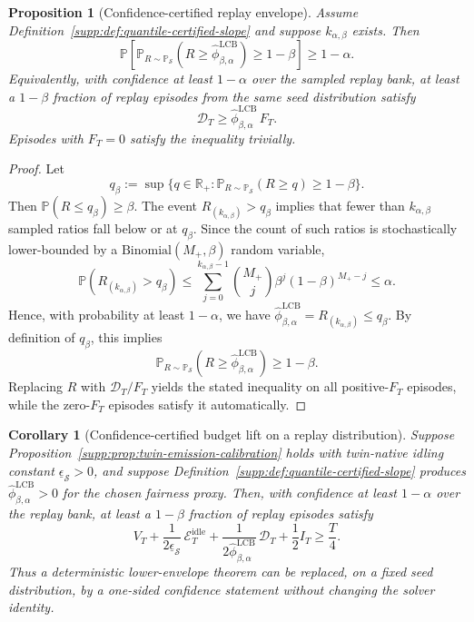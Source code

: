 \documentclass[11pt]{article}
\newcommand{\Prob}{\mathbb{P}}
\newcommand{\1}{\mathbf{1}}
\theoremstyle{definition}
\theoremstyle{plain}
\newtheorem{proposition}[definition]{Proposition}
\newtheorem{corollary}[definition]{Corollary}
\theoremstyle{remark}
\begin{document}
\begin{proposition}[Confidence-certified replay envelope]
\label{supp:prop:confidence-envelope}
Assume Definition~\ref{supp:def:quantile-certified-slope} and suppose $k_{\alpha,\beta}$ exists. Then
\[
\Prob\!\left[
\Prob_{R\sim \Prob_{\mathcal S}}\!\left(R \ge \widehat\phi^{\mathrm{LCB}}_{\beta,\alpha}\right) \ge 1-\beta
\right]
\ge 1-\alpha.
\]
Equivalently, with confidence at least $1-\alpha$ over the sampled replay bank, at least a $1-\beta$ fraction of replay episodes from the same seed distribution satisfy
\[
\mathcal D_T \ge \widehat\phi^{\mathrm{LCB}}_{\beta,\alpha}\,F_T.
\]
Episodes with $F_T=0$ satisfy the inequality trivially.
\end{proposition}

\begin{proof}
Let
\[
q_\beta := \sup\{q\in\mathbb R_+ : \Prob_{R\sim \Prob_{\mathcal S}}(R\ge q)\ge 1-\beta\}.
\]
Then $\Prob(R\le q_\beta)\ge \beta$. The event $R_{(k_{\alpha,\beta})}>q_\beta$ implies that fewer than $k_{\alpha,\beta}$ sampled ratios fall below or at $q_\beta$. Since the count of such ratios is stochastically lower-bounded by a $\mathrm{Binomial}(M_+,\beta)$ random variable,
\[
\Prob\!\left(R_{(k_{\alpha,\beta})}>q_\beta\right)
\le
\sum_{j=0}^{k_{\alpha,\beta}-1}\binom{M_+}{j}\beta^j(1-\beta)^{M_+-j}
\le \alpha.
\]
Hence, with probability at least $1-\alpha$, we have $\widehat\phi^{\mathrm{LCB}}_{\beta,\alpha}=R_{(k_{\alpha,\beta})}\le q_\beta$. By definition of $q_\beta$, this implies
\[
\Prob_{R\sim \Prob_{\mathcal S}}\!\left(R\ge \widehat\phi^{\mathrm{LCB}}_{\beta,\alpha}\right) \ge 1-\beta.
\]
Replacing $R$ with $\mathcal D_T/F_T$ yields the stated inequality on all positive-$F_T$ episodes, while the zero-$F_T$ episodes satisfy it automatically.
\end{proof}

\begin{corollary}[Confidence-certified budget lift on a replay distribution]
\label{supp:cor:confidence-budget-lift}
Suppose Proposition~\ref{supp:prop:twin-emission-calibration} holds with twin-native idling constant $\underline\epsilon_{\mathcal S}>0$, and suppose Definition~\ref{supp:def:quantile-certified-slope} produces $\widehat\phi^{\mathrm{LCB}}_{\beta,\alpha}>0$ for the chosen fairness proxy. Then, with confidence at least $1-\alpha$ over the replay bank, at least a $1-\beta$ fraction of replay episodes satisfy
\[
V_T
+ \frac{1}{2\underline\epsilon_{\mathcal S}}\,\mathcal E_T^{\mathrm{idle}}
+ \frac{1}{2\widehat\phi^{\mathrm{LCB}}_{\beta,\alpha}}\,\mathcal D_T
+ \frac{1}{2} I_T
\ge \frac{T}{4}.
\]
Thus a deterministic lower-envelope theorem can be replaced, on a fixed seed distribution, by a one-sided confidence statement without changing the solver identity.
\end{corollary}
\end{document}
